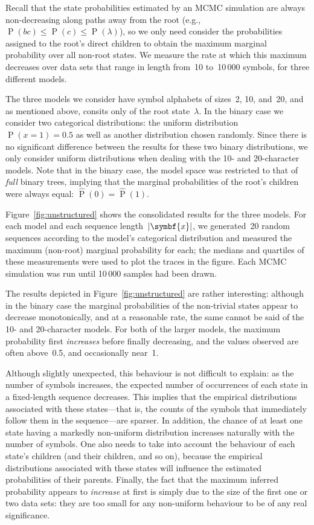 \documentclass[11pt,a4paper]{article}
\newcommand\ub[1]{\symbf{#1}}                 %
\DeclareMathOperator\Pb{P}                    %
\DeclarePairedDelimiter\abs{\lvert}{\rvert}   %
\newcommand\peq{\mathop{=}}              %
\begin{document}
Recall that the state probabilities estimated by an MCMC simulation are always
non-decreasing along paths away from the root (e.g., \(\Pb(bc) \le \Pb(c) \le
\Pb(\lambda)\)), so we only need consider the probabilities assigned to the
root's direct children to obtain the maximum marginal probability over all
non-root states. We measure the rate at which this maximum decreases over data
sets that range in length from~10 to~10\,000 symbols, for three different
models.

The three models we consider have symbol alphabets of sizes~2, 10, and~20, and
as mentioned above, consits only of the root state~\(\lambda\). In the binary
case we consider two categorical distributions: the uniform distribution~\(\Pb(x
\peq 1) = 0.5\) as well as another distribution chosen randomly. Since there is
no significant difference between the results for these two binary
distributions, we only consider uniform distributions when dealing with the 10-
and 20-character models. Note that in the binary case, the model space was
restricted to that of \emph{full} binary trees, implying that the marginal
probabilities of the root's children were always equal: \(\hat{\Pb}(0) =
\hat{\Pb}(1)\).

Figure~\ref{fig:unstructured} shows the consolidated results for the three
models. For each model and each sequence length~\(\abs{\ub{x}}\), we
generated~20 random sequences according to the model's categorical distribution
and measured the maximum (non-root) marginal probability for each; the medians
and quartiles of these measurements were used to plot the traces in the figure.
Each MCMC simulation was run until 10\,000 samples had been drawn.
%


The results depicted in Figure~\ref{fig:unstructured} are rather interesting:
although in the binary case the marginal probabilities of the non-trivial states
appear to decrease monotonically, and at a reasonable rate, the same cannot be
said of the 10- and 20-character models. For both of the larger models, the
maximum probability first \emph{increases} before finally decreasing, and the
values observed are often above~0.5, and occasionally near~1.

Although slightly unexpected, this behaviour is not difficult to explain: as the
number of symbols increases, the expected number of occurrences of each state in
a fixed-length sequence decreases. This implies that the empirical distributions
associated with these states---that is, the counts of the symbols that
immediately follow them in the sequence---are sparser. In addition, the chance
of at least one state having a markedly non-uniform distribution increases
naturally with the number of symbols. One also needs to take into account the
behaviour of each state's children (and their children, and so on), because the
empirical distributions associated with these states will influence the
estimated probabilities of their parents. Finally, the fact that the maximum
inferred probability appears to \emph{increase} at first is simply due to the
size of the first one or two data sets: they are too small for any non-uniform
behaviour to be of any real significance.
\end{document}
